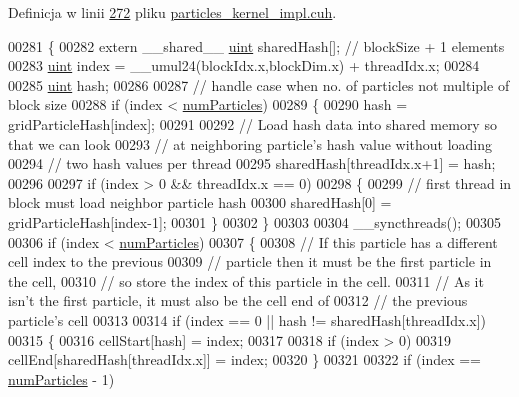 Definicja w linii \hyperlink{particles__kernel__impl_8cuh_source_l00272}{272} pliku \hyperlink{particles__kernel__impl_8cuh_source}{particles\-\_\-kernel\-\_\-impl.\-cuh}.


\begin{DoxyCode}
00281 \{
00282     \textcolor{keyword}{extern} \_\_shared\_\_ \hyperlink{particles__kernel_8cuh_a91ad9478d81a7aaf2593e8d9c3d06a14}{uint} sharedHash[];    \textcolor{comment}{// blockSize + 1 elements}
00283     \hyperlink{particles__kernel_8cuh_a91ad9478d81a7aaf2593e8d9c3d06a14}{uint} index = \_\_umul24(blockIdx.x,blockDim.x) + threadIdx.x;
00284 
00285     \hyperlink{particles__kernel_8cuh_a91ad9478d81a7aaf2593e8d9c3d06a14}{uint} hash;
00286 
00287     \textcolor{comment}{// handle case when no. of particles not multiple of block size}
00288     \textcolor{keywordflow}{if} (index < \hyperlink{particles_8cpp_a05b8a90212054a3eb1a036ae0c269596}{numParticles})
00289     \{
00290         hash = gridParticleHash[index];
00291 
00292         \textcolor{comment}{// Load hash data into shared memory so that we can look}
00293         \textcolor{comment}{// at neighboring particle's hash value without loading}
00294         \textcolor{comment}{// two hash values per thread}
00295         sharedHash[threadIdx.x+1] = hash;
00296 
00297         \textcolor{keywordflow}{if} (index > 0 && threadIdx.x == 0)
00298         \{
00299             \textcolor{comment}{// first thread in block must load neighbor particle hash}
00300             sharedHash[0] = gridParticleHash[index-1];
00301         \}
00302     \}
00303 
00304     \_\_syncthreads();
00305 
00306     \textcolor{keywordflow}{if} (index < \hyperlink{particles_8cpp_a05b8a90212054a3eb1a036ae0c269596}{numParticles})
00307     \{
00308         \textcolor{comment}{// If this particle has a different cell index to the previous}
00309         \textcolor{comment}{// particle then it must be the first particle in the cell,}
00310         \textcolor{comment}{// so store the index of this particle in the cell.}
00311         \textcolor{comment}{// As it isn't the first particle, it must also be the cell end of}
00312         \textcolor{comment}{// the previous particle's cell}
00313 
00314         \textcolor{keywordflow}{if} (index == 0 || hash != sharedHash[threadIdx.x])
00315         \{
00316             cellStart[hash] = index;
00317 
00318             \textcolor{keywordflow}{if} (index > 0)
00319                 cellEnd[sharedHash[threadIdx.x]] = index;
00320         \}
00321 
00322         \textcolor{keywordflow}{if} (index == \hyperlink{particles_8cpp_a05b8a90212054a3eb1a036ae0c269596}{numParticles} - 1)

\end{DoxyCode}
